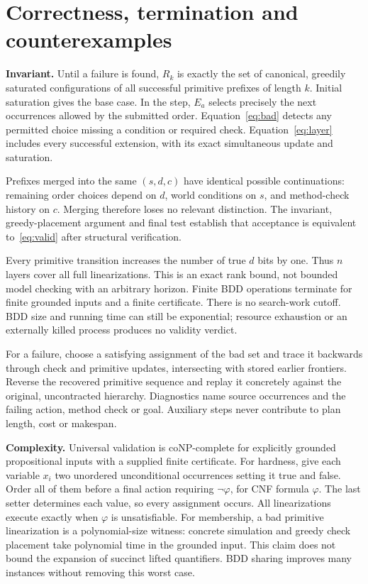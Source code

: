 \documentclass[10pt,a4paper,twocolumn]{article}
\begin{document}
\section{Correctness, termination and counterexamples}
\textbf{Invariant.}
Until a failure is found, $R_k$ is exactly the set of canonical, greedily
saturated configurations of all successful primitive prefixes of length $k$.
Initial saturation gives the base case. In the step, $E_a$ selects precisely the
next occurrences allowed by the submitted order. Equation~\eqref{eq:bad}
detects any permitted choice missing a condition or required check.
Equation~\eqref{eq:layer} includes every successful extension, with its exact
simultaneous update and saturation.

Prefixes merged into the same $(s,d,c)$ have identical possible continuations:
remaining order choices depend on $d$, world conditions on $s$, and method-check
history on $c$. Merging therefore loses no relevant distinction. The invariant,
greedy-placement argument and final test establish that acceptance is equivalent
to~\eqref{eq:valid} after structural verification.

Every primitive transition increases the number of true $d$ bits by one.
Thus $n$ layers cover all full linearizations. This is an exact rank bound,
not bounded model checking with an arbitrary horizon. Finite BDD operations
terminate for finite grounded inputs and a finite certificate. There is no
search-work cutoff. BDD size and running time can still be exponential;
resource exhaustion or an externally killed process produces no validity verdict.

For a failure, choose a satisfying assignment of the bad set and trace it
backwards through check and primitive updates, intersecting with stored earlier
frontiers. Reverse the recovered primitive sequence and replay it concretely
against the original, uncontracted hierarchy. Diagnostics name source occurrences
and the failing action, method check or goal. Auxiliary steps never contribute
to plan length, cost or makespan.

\textbf{Complexity.}
Universal validation is coNP-complete for explicitly grounded propositional
inputs with a supplied finite certificate. For hardness, give each variable
$x_i$ two unordered unconditional occurrences setting it true and false.
Order all of them before a final action requiring $\neg\varphi$, for CNF formula
$\varphi$. The last setter determines each value, so every assignment occurs.
All linearizations execute exactly when $\varphi$ is unsatisfiable. For membership,
a bad primitive linearization is a polynomial-size witness: concrete simulation
and greedy check placement take polynomial time in the grounded input. This
claim does not bound the expansion of succinct lifted quantifiers. BDD sharing
improves many instances without removing this worst case.
\end{document}
